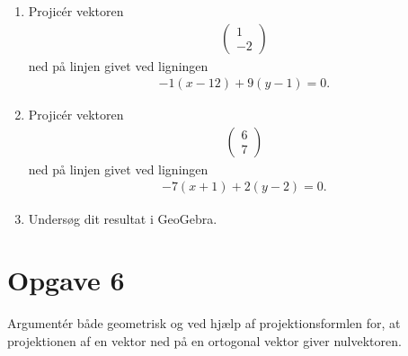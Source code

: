 \begin{enumerate}[label=\roman*)]
	\item Projicér vektoren 
	\begin{align*}
		\begin{pmatrix}
			1 \\ -2
		\end{pmatrix}
	\end{align*}
	ned på linjen givet ved ligningen
	\begin{align*}
		-1(x-12) + 9(y-1) = 0.
	\end{align*}
	\item Projicér vektoren 
	\begin{align*}
		\begin{pmatrix}
			6 \\  7
		\end{pmatrix}
	\end{align*}
	ned på linjen givet ved ligningen
	\begin{align*}
		-7(x+1) + 2(y-2) = 0.
	\end{align*}
	\item Undersøg dit resultat i GeoGebra.
\end{enumerate}

\section*{Opgave 6}
Argumentér både geometrisk og ved hjælp af projektionsformlen for, at projektionen af en vektor ned på en ortogonal vektor giver nulvektoren. 


